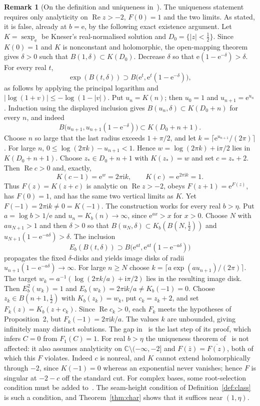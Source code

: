 \documentclass[11pt,a4paper]{article}
\theoremstyle{definition}
\newtheorem{remark}[theorem]{Remark}
\newcommand{\eee}{\mathrm{e}}
\newcommand{\ii}{\mathrm{i}}
\begin{document}
\begin{remark}[On the definition and uniqueness in~\cite{Paulsen2019}]
The uniqueness statement~\cite[Prop.~2]{Paulsen2019} requires only
analyticity on $\operatorname{Re}z>-2$, $F(0)=1$ and the two limits.  As stated,
it is false, already at $b=\eee$, by the following exact existence argument.
Let $K=\operatorname{sexp}_{\eee}$ be Kneser's real-normalised solution and
$D_0=\{|z|<\tfrac12\}$.  Since $K(0)=1$ and $K$ is nonconstant and
holomorphic, the open-mapping theorem gives $\delta>0$ such that
$B(1,\delta)\subset K(D_0)$.  Decrease $\delta$ so that
$\eee(1-\eee^{-\delta})>\delta$.  For every real $t$,
\[
 \exp(B(t,\delta))\supset
 B\bigl(\eee^t,\eee^t(1-\eee^{-\delta})\bigr),
\]
as follows by applying the principal logarithm and
$|\log(1+v)|\le-\log(1-|v|)$.  Put $u_n=K(n)$; then $u_0=1$ and
$u_{n+1}=\eee^{u_n}$.  Induction using the displayed inclusion gives
$B(u_n,\delta)\subset K(D_0+n)$ for every $n$, and indeed
\[
 B\bigl(u_{n+1},u_{n+1}(1-\eee^{-\delta})\bigr)
 \subset K(D_0+n+1).
\]
Choose $n$ so large that the last radius exceeds $1+\pi/2$, and let
$k=\lceil\eee^{u_{n+1}}/(2\pi)\rceil$.  For large $n$,
$0\le\log(2\pi k)-u_{n+1}<1$.  Hence
$w=\log(2\pi k)+\ii\pi/2$ lies in $K(D_0+n+1)$.  Choose
$z_*\in D_0+n+1$ with $K(z_*)=w$ and set $c=z_*+2$.
Then $\operatorname{Re}c>0$ and, exactly,
\[
 K(c-1)=\eee^w=2\pi\ii k,\qquad
 K(c)=\eee^{2\pi\ii k}=1.
\]
Thus $F(z)=K(z+c)$ is analytic on $\operatorname{Re}z>-2$, obeys
$F(z+1)=\eee^{F(z)}$, has $F(0)=1$, and has the same two vertical limits
as $K$.  Yet $F(-1)=2\pi\ii k\ne0=K(-1)$.
The construction works for every real $b>\eta$.  Put $a=\log b>1/\eee$
and $u_n=K_b(n)\to\infty$, since $\eee^{ax}>x$ for $x>0$.
Choose $N$ with $a u_{N+1}>1$ and then
$\delta>0$ so that $B(u_N,\delta)\subset K_b(B(N,\tfrac12))$ and
$u_{N+1}(1-\eee^{-a\delta})>\delta$.  The inclusion
\[
 E_b(B(t,\delta))\supset
 B\bigl(\eee^{at},\eee^{at}(1-\eee^{-a\delta})\bigr)
\]
propagates the fixed $\delta$-disks and yields image disks of radii
$u_{n+1}(1-\eee^{-a\delta})\to\infty$.  For large
$n\ge N$ choose $k=\lceil a\exp(a u_{n+1})/(2\pi)\rceil$.
The target $w_k=a^{-1}(\log(2\pi k/a)+\ii\pi/2)$ lies in the
resulting image disk.  Then
$E_b^2(w_k)=1$ and $E_b(w_k)=2\pi\ii k/a\ne K_b(-1)=0$.
Choose $z_k\in B(n+1,\tfrac12)$ with $K_b(z_k)=w_k$, put $c_k=z_k+2$,
and set $F_k(z)=K_b(z+c_k)$.  Since $\operatorname{Re}c_k>0$, each $F_k$
meets the hypotheses of Proposition~2, but $F_k(-1)=2\pi\ii k/a$.
The values $k$ are unbounded, giving infinitely many distinct solutions.
The gap in~\cite[Prop.~2]{Paulsen2019} is the last step of its proof,
which infers $C=0$ from $F_1(C)=1$.  For real $b>\eta$ the uniqueness
theorem of~\cite{PaulsenCowgill2017} is not affected: it also assumes
analyticity on $\mathbb C\setminus(-\infty,-2]$ and $F(\bar z)=\overline{F(z)}$,
both of which this $F$ violates.  Indeed $c$ is nonreal, and $K$ cannot
extend holomorphically through $-2$, since $K(-1)=0$ whereas an exponential
never vanishes; hence $F$ is singular at $-2-c$ off the standard cut.
For complex bases, some root-selection
condition must be added to~\cite[Prop.~2]{Paulsen2019}.  The seam-height
condition of Definition~\ref{def:class} is such a condition, and
Theorem~\ref{thm:char} shows that it suffices near $(1,\eta)$.
\end{remark}
\end{document}
